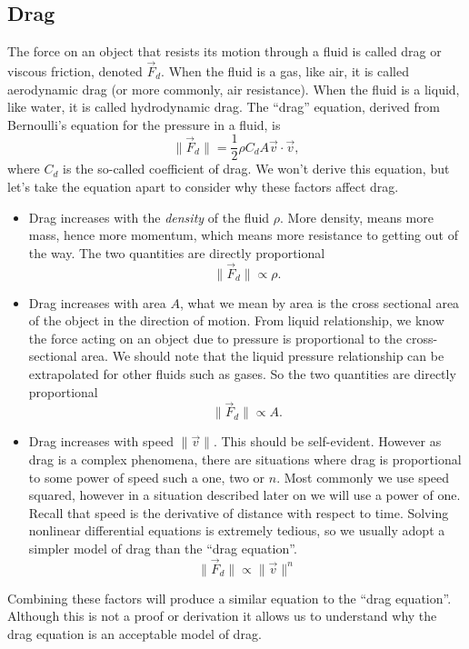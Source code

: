 \subsection{Drag}
\label{subsection:drag}

The force on an object that resists its motion through a fluid is called drag or viscous friction, denoted $\vec{F}_d$. When the fluid is a gas, like air, it is called aerodynamic drag (or more commonly, air resistance). When the fluid is a liquid, like water, it is called hydrodynamic drag. The ``drag'' equation, derived from Bernoulli's equation for the pressure in a fluid, is 
\begin{equation}
    \| \vec{F}_d \| = \frac{1}{2}\rho C_d A \vec{v} \cdot \vec{v},
\end{equation}
where $C_d$ is the so-called coefficient of drag. We won't derive this equation, but let's take the equation apart to consider why these factors affect drag.
\begin{itemize}
    \item Drag increases with the \textit{density} of the fluid $\rho$. More density, means more mass, hence more momentum, which means more resistance to getting out of the way. The two quantities are directly proportional
    \begin{equation*}
        \| \vec{F}_d \| \propto \rho.
    \end{equation*}
    \item Drag increases with area $A$, what we mean by area is the cross sectional area of the object in the direction of motion. From liquid relationship, we know the force acting on an object due to pressure is proportional to the cross-sectional area. We should note that the liquid pressure relationship can be extrapolated for other fluids such as gases. So the two quantities are directly proportional
    \begin{equation*}
        \| \vec{F}_d \| \propto A.
    \end{equation*}
    \item Drag increases with speed $\| \vec{v} \|$. This should be self-evident. However as drag is a complex phenomena, there are situations where drag is proportional to some power of speed such a one, two or $n$. Most commonly we use speed squared, however in a situation described later on we will use a power of one. Recall that speed is the derivative of distance with respect to time. Solving nonlinear differential equations is extremely tedious, so we usually adopt a simpler model of drag than the ``drag equation''. 
    \begin{equation*}
        \| \vec{F}_d \| \propto \| \vec{v} \|^n
    \end{equation*}
\end{itemize}
Combining these factors will produce a similar equation to the ``drag equation''. Although this is not a proof or derivation it allows us to understand why the drag equation is an acceptable model of drag. 

